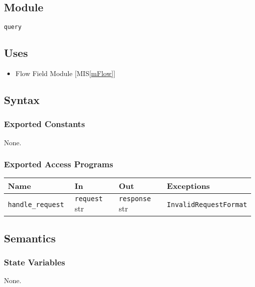 \documentclass[12pt, titlepage]{article}
\begin{document}


\subsection{Module}
\texttt{query}

\subsection{Uses}
\begin{itemize}
\item Flow Field Module [MIS\ref{mFlow}]
\end{itemize}

\subsection{Syntax}

\subsubsection{Exported Constants}
None.

\subsubsection{Exported Access Programs}

\begin{center}
\begin{tabular}{p{3cm} p{4cm} p{4cm} p{4cm}}
\hline
\textbf{Name} & \textbf{In} & \textbf{Out} & \textbf{Exceptions} \\
\hline
\texttt{handle\_request }& \texttt{request} str & \texttt{response} str & \texttt{InvalidRequestFormat} \\
\hline
\end{tabular}
\end{center}

\subsection{Semantics}

\subsubsection{State Variables}
None.
\end{document}
